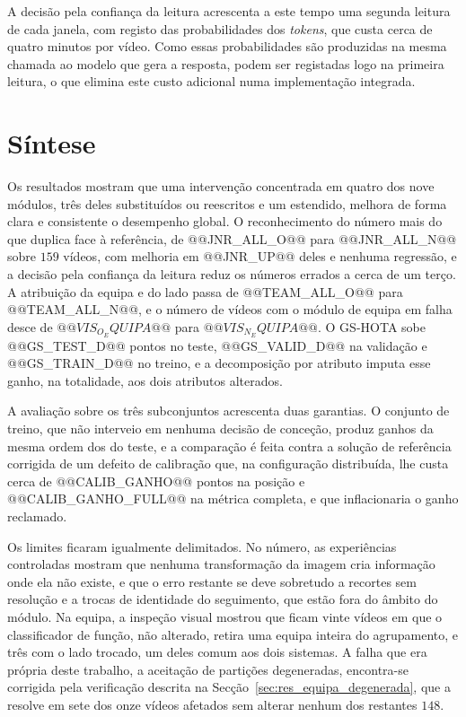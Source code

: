 A decisão pela confiança da leitura acrescenta a este tempo uma segunda leitura de cada janela, com
registo das probabilidades dos \emph{tokens}, que custa cerca de quatro minutos por vídeo. Como essas
probabilidades são produzidas na mesma chamada ao modelo que gera a resposta, podem ser registadas
logo na primeira leitura, o que elimina este custo adicional numa implementação integrada.

\section{Síntese}\label{sec:res_sintese}

Os resultados mostram que uma intervenção concentrada em quatro dos nove módulos, três deles
substituídos ou reescritos e um estendido, melhora de forma clara e consistente o desempenho
global. O reconhecimento do número mais do que duplica face à referência, de @@JNR_ALL_O@@ para
@@JNR_ALL_N@@ sobre $159$ vídeos, com melhoria em @@JNR_UP@@ deles e nenhuma regressão, e a decisão pela confiança da leitura
reduz os números errados a cerca de um terço. A
atribuição da equipa e do lado passa de @@TEAM_ALL_O@@ para @@TEAM_ALL_N@@, e o número de vídeos
com o módulo de equipa em falha desce de $@@VIS_O_EQUIPA@@$ para $@@VIS_N_EQUIPA@@$. O GS-HOTA sobe
@@GS_TEST_D@@ pontos no teste, @@GS_VALID_D@@ na validação e @@GS_TRAIN_D@@ no treino, e a
decomposição por atributo imputa esse ganho, na totalidade, aos dois atributos alterados.

A avaliação sobre os três subconjuntos acrescenta duas garantias. O conjunto de treino, que não
interveio em nenhuma decisão de conceção, produz ganhos da mesma ordem dos do teste, e a
comparação é feita contra a solução de referência corrigida de um defeito de calibração que, na
configuração distribuída, lhe custa cerca de @@CALIB_GANHO@@ pontos na posição e @@CALIB_GANHO_FULL@@
na métrica completa, e que inflacionaria o ganho reclamado.

Os limites ficaram igualmente delimitados. No número, as experiências controladas mostram que nenhuma
transformação da imagem cria informação onde ela não existe, e que o erro restante se deve sobretudo
a recortes sem resolução e a trocas de identidade do seguimento, que estão fora do âmbito do módulo. Na equipa, a inspeção
visual mostrou que ficam vinte vídeos em que o classificador de função, não
alterado, retira uma equipa inteira do agrupamento, e três com o lado trocado, um deles comum aos
dois sistemas. A falha que era própria deste trabalho, a aceitação de partições degeneradas,
encontra-se corrigida pela verificação descrita na Secção~\ref{sec:res_equipa_degenerada}, que a
resolve em sete dos onze vídeos afetados sem alterar nenhum dos restantes $148$.
